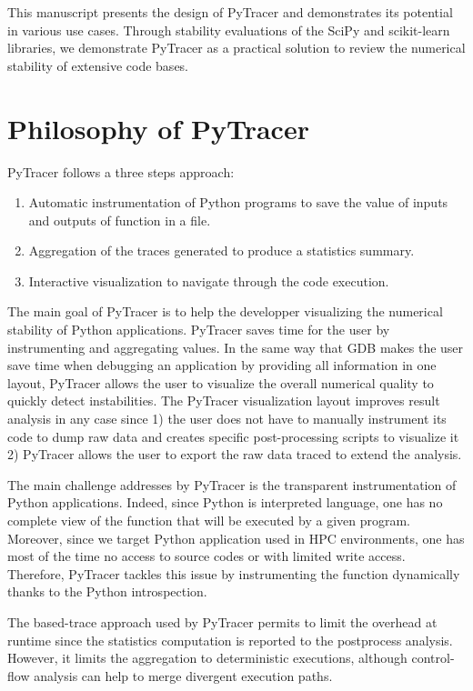 \documentclass[10pt,journal,compsoc]{IEEEtran}
\newcommand{\pytracer}[0]{PyTracer\xspace}
\DeclareRobustCommand{\add}[1]{#1}
\begin{document}
This manuscript presents the design of \pytracer and demonstrates its potential
in various use cases. Through stability evaluations of the SciPy and
scikit-learn libraries, we demonstrate \pytracer as a practical solution to
review the numerical stability of extensive code bases. 

\section{Philosophy of \pytracer}

\add{PyTracer follows a three steps approach:}
\begin{enumerate}
    \item \add{Automatic instrumentation of Python programs to save the value of inputs and outputs of function in a file.}
    \item \add{Aggregation of the traces generated to produce a statistics summary.}
    \item \add{Interactive visualization to navigate through the code execution.}
\end{enumerate}

\add{
    The main goal of PyTracer is to help the developper visualizing the numerical
    stability of Python applications. PyTracer saves time for the user by
    instrumenting and aggregating values. In the same way that GDB makes the user
    save time when debugging an application by providing all information in one
    layout, PyTracer allows the user to visualize the overall numerical quality to
    quickly detect instabilities. The PyTracer visualization layout improves result
    analysis in any case since 1) the user does not have to manually instrument its
    code to dump raw data and creates specific post-processing scripts to visualize
    it 2) PyTracer allows the user to export the raw data traced to extend the
    analysis. 
}

\add{
    The main challenge addresses by PyTracer is the transparent instrumentation of Python 
    applications. Indeed, since Python is interpreted language, one has no complete 
    view of the function that will be executed by a given program. 
    Moreover, since we target Python application used in HPC environments, one has
    most of the time no access to source codes or with limited write access.
    Therefore, PyTracer tackles this issue by instrumenting the function dynamically 
    thanks to the Python introspection.
}

\add{
    The based-trace approach used by PyTracer permits to limit the 
    overhead at runtime since the statistics computation is reported to the postprocess analysis.
    However, it limits the aggregation to deterministic executions,
    although control-flow analysis can help to merge divergent execution paths.
}
\end{document}
